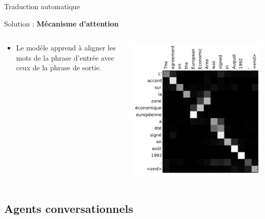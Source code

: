 \documentclass[french]{beamer}
\begin{document}
\begin{frame}{Traduction automatique}

\centering
{\Large Solution : \textbf{Mécanisme d'attention} \cite{bahdanau2014neural}}
\begin{columns}[T] %
\begin{column}{.45\textwidth}

\vspace{2cm}
\begin{itemize}
	\item Le modèle apprend à aligner les mots de la phrase d'entrée avec ceux de la phrase de sortie.
\end{itemize}

\end{column}%
\hfill%
\begin{column}{.55\textwidth}
\centering
\includegraphics[width=\textwidth]{figures/attention_visualisation}
\end{column}%
\end{columns}

\end{frame}


\subsection{Agents conversationnels}
\end{document}

